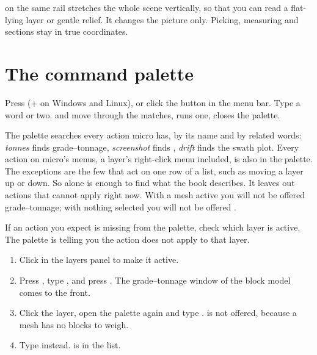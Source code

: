  on the same rail stretches the whole scene vertically, so that you can read a flat-lying layer or gentle relief. It changes the picture only. Picking, measuring and sections stay in true coordinates.

\section{The command palette}\label{sec:start-palette}
Press  (+ on Windows and Linux), or click the  button in the menu bar. Type a word or two.  and  move through the matches,  runs one,  closes the palette.


The palette searches every action micro has, by its name and by related words: \emph{tonnes} finds grade–tonnage, \emph{screenshot} finds , \emph{drift} finds the swath plot. Every action on micro's menus, a layer's right-click menu included, is also in the palette. The exceptions are the few that act on one row of a list, such as moving a layer up or down. So  alone is enough to find what the book describes. It leaves out actions that cannot apply right now. With a mesh active you will not be offered grade–tonnage; with nothing selected you will not be offered .

\begin{tip}
If an action you expect is missing from the palette, check which layer is active. The palette is telling you the action does not apply to that layer.
\end{tip}

\begin{tryit}
\begin{enumerate}
\item Click  in the layers panel to make it active.
\item Press , type , and press . The grade–tonnage window of the block model comes to the front.
\item Click the  layer, open the palette again and type .  is not offered, because a mesh has no blocks to weigh.
\item Type  instead.  is in the list.
\end{enumerate}
\end{tryit}

